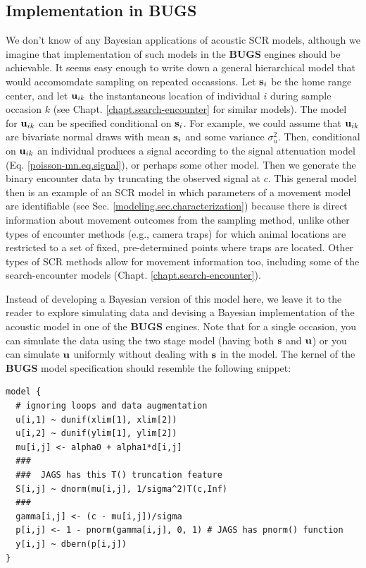 \subsection{Implementation in {\bf BUGS}}
\label{acoustic.bugs}

We don't know of any Bayesian applications of acoustic SCR models,
although we imagine that implementation of such models in the {\bf
  BUGS} engines should be achievable.  It seems easy enough to write
down a general hierarchical model that would accomomdate sampling on
repeated occassions. Let ${\bf s}_{i}$ be the home range center, and
let ${\bf u}_{ik}$ the instantaneous location of individual $i$ during
sample occasion $k$ (see Chapt. \ref{chapt.search-encounter} for
similar models). The model for ${\bf u}_{ik}$ can be specified
conditional on ${\bf s}_{i}$. For example, we could assume that ${\bf
  u}_{ik}$ are bivariate normal draws with mean ${\bf s}_{i}$ and some
variance $\sigma_{u}^{2}$. Then, conditional on ${\bf u}_{ik}$ an
individual produces a signal according to the signal attenuation model
(Eq. \ref{poisson-mn.eq.signal}), or perhaps some other model. Then we
generate the binary encounter data by truncating the observed signal
at $c$. This general model then is an example of an SCR model in which
parameters of a movement model are identifiable
(see Sec. \ref{modeling.sec.characterization})
 because
there is direct information about movement outcomes from the sampling
method, unlike other types of encounter methods (e.g., camera traps)
for which animal locations are restricted to a set of fixed, pre-determined
points where traps are located.  Other types of SCR methods allow for
movement information too, including some of the search-encounter
models (Chapt. \ref{chapt.search-encounter}).


Instead of developing a Bayesian version of this model here,
we leave it to the reader to
explore simulating data and devising a Bayesian implementation of the
acoustic model in one of the {\bf BUGS} engines.
Note that for a
single occasion, you can simulate the data using the two stage model
(having both ${\bf s}$ and ${\bf u}$) or you can simulate ${\bf u}$
uniformly without dealing with ${\bf s}$ in the model.
The kernel of the {\bf BUGS} model specification 
should resemble the following snippet:
{\small
\begin{verbatim}
model {
  # ignoring loops and data augmentation
  u[i,1] ~ dunif(xlim[1], xlim[2])
  u[i,2] ~ dunif(ylim[1], ylim[2])
  mu[i,j] <- alpha0 + alpha1*d[i,j]
  ###
  ###  JAGS has this T() truncation feature
  S[i,j] ~ dnorm(mu[i,j], 1/sigma^2)T(c,Inf) 
  ###
  gamma[i,j] <- (c - mu[i,j])/sigma
  p[i,j] <- 1 - pnorm(gamma[i,j], 0, 1) # JAGS has pnorm() function
  y[i,j] ~ dbern(p[i,j])
}
\end{verbatim}
}



